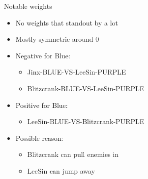 \begin{frame}{Notable weights}
  \begin{itemize}
  \item No weights that standout by a lot
  \item Mostly symmetric around 0
  \end{itemize}
  \vspace{0.05cm}
  \begin{itemize}
  \item Negative for Blue:
    \begin{itemize}
    \item Jinx-BLUE-VS-LeeSin-PURPLE
    \item Blitzcrank-BLUE-VS-LeeSin-PURPLE
    \end{itemize}
  \item Positive for Blue:
    \begin{itemize}
    \item LeeSin-BLUE-VS-Blitzcrank-PURPLE
    \end{itemize}
  \item Possible reason:
    \begin{itemize}
    \item Blitzcrank can pull enemies in
    \item LeeSin can jump away
    \end{itemize}
  \end{itemize}
\end{frame}

